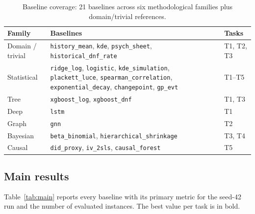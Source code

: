 \begin{table}[t]
  \centering
  \small
  \begin{threeparttable}
  \caption{Baseline coverage: 21 baselines across six methodological families
  plus domain/trivial references.}
  \label{tab:coverage}
  \begin{tabular}{@{}p{2.4cm}p{8.2cm}p{2.6cm}@{}}
    \toprule
    Family & Baselines & Tasks \\
    \midrule
    Domain / trivial & \texttt{history\_mean}, \texttt{kde}, \texttt{psych\_sheet},
                       \texttt{historical\_dnf\_rate} & T1, T2, T3 \\
    Statistical & \texttt{ridge\_log}, \texttt{logistic}, \texttt{kde\_simulation},
                  \texttt{plackett\_luce}, \texttt{spearman\_correlation},
                  \texttt{exponential\_decay}, \texttt{changepoint}, \texttt{gp\_evt} & T1--T5 \\
    Tree & \texttt{xgboost\_log}, \texttt{xgboost\_dnf} & T1, T3 \\
    Deep & \texttt{lstm} & T1 \\
    Graph & \texttt{gnn} & T2 \\
    Bayesian & \texttt{beta\_binomial}, \texttt{hierarchical\_shrinkage} & T3, T4 \\
    Causal & \texttt{did\_proxy}, \texttt{iv\_2sls}, \texttt{causal\_forest} & T5 \\
    \bottomrule
  \end{tabular}
  \end{threeparttable}
\end{table}

\subsection{Main results}
\label{sec:results-main}

Table~\ref{tab:main} reports every baseline with its primary metric for the
seed-42 run and the number of evaluated instances. The best value per task is
in bold.

